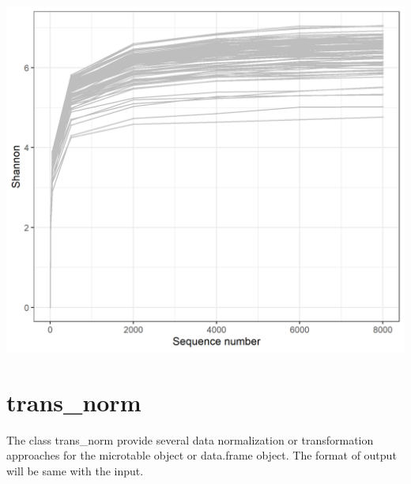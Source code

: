 \documentclass[
]{book}
\begin{document}
\begin{center}\includegraphics[width=550px]{Images/plot_trans_rarefy} \end{center}

\hypertarget{trans_norm}{%
\section{trans\_norm}\label{trans_norm}}

The class trans\_norm provide several data normalization or transformation approaches for the microtable object or data.frame object.
The format of output will be same with the input.
\end{document}
